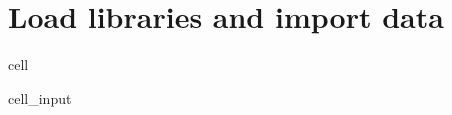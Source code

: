 \documentclass[letterpaper,10pt,english]{jupyterBook}
\begin{document}
\section{Load libraries and import data}
\label{\detokenize{code/notebooks/inflation:load-libraries-and-import-data}}
\begin{sphinxuseclass}{cell}\begin{sphinxVerbatimInput}

\begin{sphinxuseclass}{cell_input}
\begin{sphinxVerbatim}[commandchars=\\\{\}]
   
   

   
   
\end{sphinxVerbatim}

\end{sphinxuseclass}\end{sphinxVerbatimInput}

\end{sphinxuseclass}
\end{document}
